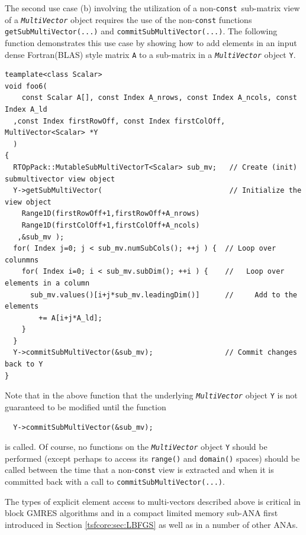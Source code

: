 The second use case (b) involving the utilization of a
non-{}\texttt{const}\ sub-matrix view of a
{}\texttt{\textit{Multi\-Vector}} object requires the use of the
non-{}\texttt{const} functions {}\texttt{get\-Sub\-Multi\-Vector(...)}
and {}\texttt{commit\-Sub\-Multi\-Vector(...)}.  The following
function demonstrates this use case by showing how to add elements in
an input dense Fortran(BLAS) style matrix {}\texttt{A} to a sub-matrix
in a {}\texttt{\textit{Multi\-Vector}} object {}\texttt{Y}.

{\scriptsize\begin{verbatim}
teamplate<class Scalar>
void foo6(
	const Scalar A[], const Index A_nrows, const Index A_ncols, const Index A_ld
  ,const Index firstRowOff, const Index firstColOff, MultiVector<Scalar> *Y
  )
{
  RTOpPack::MutableSubMultiVectorT<Scalar> sub_mv;   // Create (init) submultivector view object
  Y->getSubMultiVector(                              // Initialize the view object
    Range1D(firstRowOff+1,firstRowOff+A_nrows)
    Range1D(firstColOff+1,firstColOff+A_ncols)
   ,&sub_mv );
  for( Index j=0; j < sub_mv.numSubCols(); ++j ) {  // Loop over colunmns
    for( Index i=0; i < sub_mv.subDim(); ++i ) {    //   Loop over elements in a column
      sub_mv.values()[i+j*sub_mv.leadingDim()]      //     Add to the elements
        += A[i+j*A_ld];
    }
  }
  Y->commitSubMultiVector(&sub_mv);                 // Commit changes back to Y
}
\end{verbatim}}

Note that in the above function that the underlying
{}\texttt{\textit{Multi\-Vector}} object {}\texttt{Y} is not
guaranteed to be modified until the function

{\scriptsize\begin{verbatim}
  Y->commitSubMultiVector(&sub_mv);
\end{verbatim}}

{}\noindent{}is called.  Of course, no functions on the
{}\texttt{\textit{Multi\-Vector}} object {}\texttt{Y} should be
performed (except perhaps to access its {}\texttt{range()} and
{}\texttt{domain()} spaces) should be called between the time that a
non-\texttt{const} view is extracted and when it is committed back
with a call to {}\texttt{commit\-Sub\-Multi\-Vector(...)}.

The types of explicit element access to multi-vectors described above
is critical in block GMRES algorithms and in a compact limited memory
sub-ANA first introduced in Section {}\ref{tsfcore:sec:LBFGS} as well
as in a number of other ANAs.

